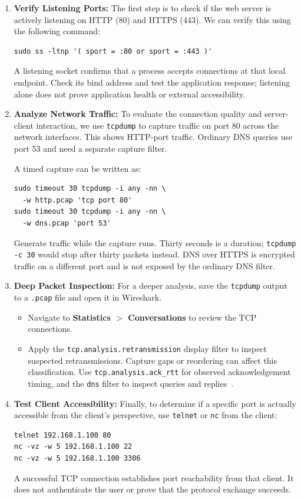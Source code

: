 \documentclass[journal]{IEEEtran}
\begin{document}
\begin{enumerate}

    \item \textbf{Verify Listening Ports:}
    The first step is to check if the web server is actively listening on HTTP (80) and HTTPS (443). We can verify this using the following command:
    \begin{lstlisting}
sudo ss -ltnp '( sport = :80 or sport = :443 )'
    \end{lstlisting}
    A listening socket confirms that a process accepts connections at that local endpoint. Check its bind address and test the application response; listening alone does not prove application health or external accessibility.

    \item \textbf{Analyze Network Traffic:}
    To evaluate the connection quality and server-client interaction, we use \texttt{tcpdump} to capture traffic on port 80 across the network interfaces. This shows HTTP-port traffic. Ordinary DNS queries use port 53 and need a separate capture filter.

    A timed capture can be written as:
    \begin{lstlisting}
sudo timeout 30 tcpdump -i any -nn \
  -w http.pcap 'tcp port 80'
sudo timeout 30 tcpdump -i any -nn \
  -w dns.pcap 'port 53'
    \end{lstlisting}
    Generate traffic while the capture runs. Thirty seconds is a duration; \texttt{tcpdump -c 30} would stop after thirty packets instead. DNS over HTTPS is encrypted traffic on a different port and is not exposed by the ordinary DNS filter.

    \item \textbf{Deep Packet Inspection:}
    For a deeper analysis, save the \texttt{tcpdump} output to a \texttt{.pcap} file and open it in Wireshark.
    \begin{itemize}
        \item Navigate to \textbf{Statistics $>$ Conversations} to review the TCP connections.
        \item Apply the \texttt{tcp.analysis.retransmission} display filter to inspect suspected retransmissions. Capture gaps or reordering can affect this classification. Use \texttt{tcp.analysis.ack\_rtt} for observed acknowledgement timing, and the \texttt{dns} filter to inspect queries and replies~\cite{wireshark}.
    \end{itemize}

    \item \textbf{Test Client Accessibility:}
    Finally, to determine if a specific port is actually accessible from the client's perspective, use \texttt{telnet} or \texttt{nc} from the client:
    \begin{lstlisting}
telnet 192.168.1.100 80
nc -vz -w 5 192.168.1.100 22
nc -vz -w 5 192.168.1.100 3306
    \end{lstlisting}
    A successful TCP connection establishes port reachability from that client. It does not authenticate the user or prove that the protocol exchange succeeds.

\end{enumerate}
\end{document}
